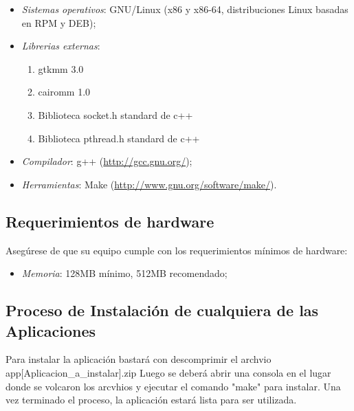 \documentclass{article}
\begin{document}
	\begin{itemize}
	\itemsep=5pt \topsep=0pt \partopsep=0pt \parskip=0pt \parsep=0pt

		\item \textit{Sistemas operativos}: GNU/Linux (x86 y x86-64, distribuciones Linux basadas en RPM y DEB);

		\item \textit{Librerias externas}: \begin{enumerate}
							\item gtkmm 3.0
							\item cairomm 1.0
							\item Biblioteca socket.h standard de c++
							\item Biblioteca pthread.h standard de c++
							\end{enumerate}

		\item \textit{Compilador}: g++ (\url{http://gcc.gnu.org/});

		\item \textit{Herramientas}: Make (\url{http://www.gnu.org/software/make/}).

	\end{itemize}
\bigskip



\subsection{Requerimientos de hardware}
	
	Asegúrese de que su equipo cumple con los requerimientos mínimos de hardware:
	\medskip

	\begin{itemize}
	\itemsep=5pt \topsep=0pt \partopsep=0pt \parskip=0pt \parsep=0pt

		\item \textit{Memoria}: 128MB mínimo, 512MB recomendado;

	\end{itemize}
\bigskip



\subsection{Proceso de Instalación de cualquiera de las Aplicaciones}
	
	Para instalar la aplicación bastará con descomprimir el archvio app[Aplicacion_a_instalar].zip
	Luego se deberá abrir una consola en el lugar donde se volcaron los arcvhios y 
	ejecutar el comando "make" para instalar.
	Una vez terminado el proceso, la aplicación estará lista para ser utilizada.
\end{document}
